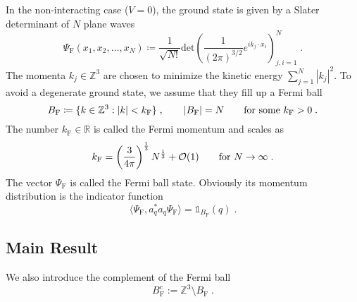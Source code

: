 \documentclass[12pt,a4paper]{article}
\numberwithin{equation}{section}
\newcommand{\ZZZ}{\mathbb{Z}}
\newcommand{\Zbb}{\mathbb{Z}}
\newcommand{\1}{\mathbb{I}}
\newcommand{\F}{\mathrm{F}}
\newcommand{\FS}{\mathrm{F}}
\newcommand{\Rbb}{\mathbb{R}}
\newcommand{\Z}{\mathbb{Z}}
\theoremstyle{plain}
\theoremstyle{definition}
\theoremstyle{remark}
\theoremstyle{plain}
\theoremstyle{definition}
\theoremstyle{remark}
\begin{document}
In the non-interacting case ($ V=0 $), the ground state is given by a Slater determinant of $ N $ plane waves
\begin{equation}
	\Psi_{\F}(x_1, x_2, \ldots, x_N) \coloneq \frac{1}{\sqrt{N!}}\text{det}\left(\frac{1}{(2\pi)^{3/2}}e^{ik_j\cdot x_i}\right)^N_{j,i=1} \;.
\end{equation}
The momenta $ k_j \in \Zbb^3$ are chosen to minimize the kinetic energy $ \sum_{j=1}^N |k_j|^2 $. To avoid a degenerate ground state, we assume that they fill up a Fermi ball
\begin{equation}
	B_{\F} \coloneq \{ k \in \ZZZ^3 : |k| < k_{\F} \} \;, \qquad
	|B_{\F}| = N \qquad \textnormal{for some } k_{\F} > 0 \;.
\end{equation}
The number $ k_{\F} \in \Rbb$ is called the Fermi momentum and scales as
\begin{equation}
	k_{\F} = \left(\frac{3}{4\pi}\right)^\frac{1}{3}N^\frac{1}{3} + \mathcal{O}(1) \qquad \textnormal{for } N\to \infty \;.
 \end{equation}
The vector  $ \Psi_{\FS} $ is called the Fermi ball state. Obviously its momentum distribution is the indicator function
\begin{equation}
	\langle \Psi_{\FS}, a_q^* a_q \Psi_{\FS} \rangle
	= \mathds{1}_{B_{\F}}(q) \;.
\end{equation}


\subsection{Main Result}
\label{subsec:mainresult}

We also introduce the complement of the Fermi ball
\begin{equation}
   B_\text{F}^c := \Zbb^3 \setminus B_\text{F} \;.
\end{equation}
\end{document}

